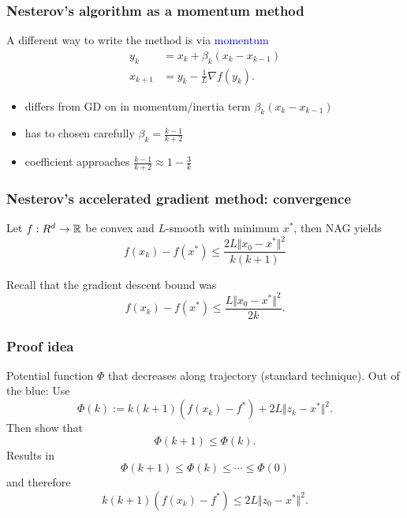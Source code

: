 \documentclass[aspectration=169]{beamer}
\begin{document}
\begin{frame}
  \frametitle{Nesterov's algorithm as a momentum method}
  A different way to write the method is via \textcolor{blue}{momentum}
  \begin{align}
    y_{k} &= x_k + \beta_k (x_k - x_{k-1}) \\
    x_{k+1} &= y_k - \frac{1}{L} \nabla f(y_k).
  \end{align}

  \begin{itemize}
    \item differs from GD on in momentum/inertia term $\beta_k (x_k - x_{k-1})$
    \item has to chosen carefully $\beta_k = \frac{k-1}{k+2}$
    \item coefficient approaches $\frac{k-1}{k+2} \approx 1 - \frac{3}{k}$
  \end{itemize}
\end{frame}


\begin{frame}
  \frametitle{Nesterov's accelerated gradient method: convergence}

  \begin{theorem}
    Let $f: R^d \to \mathbb{R}$ be convex and $L$-smooth with minimum $x^*$, then NAG yields
    \begin{equation}
      f(x_k) - f(x^*) \le \frac{2L \Vert x_0-x^* \Vert^2}{k(k+1)}
    \end{equation}
  \end{theorem}

  Recall that the gradient descent bound was
  \begin{equation}
      f(x_k) - f(x^*) \le \frac{L \Vert x_0-x^* \Vert^2}{2k}.
  \end{equation}
\end{frame}

\begin{frame}
  \frametitle{Proof idea}
  Potential function $\Phi$ that decreases along trajectory (standard technique).
  Out of the blue: Use
  \begin{equation}
    \Phi(k) := k(k+1) (f(x_k) - f^*) + 2L \Vert z_k - x^* \Vert^2.
  \end{equation}
  Then show that
  \begin{equation}
    \Phi(k+1) \le \Phi(k).
  \end{equation}
  Results in
  \begin{equation}
    \Phi(k+1) \le \Phi(k) \le \cdots \le \Phi(0)
  \end{equation}
  and therefore
  \begin{equation}
    k(k+1) (f(x_k) - f^*)  \le 2L \Vert z_0 - x^* \Vert^2.
  \end{equation}
\end{frame}
\end{document}

